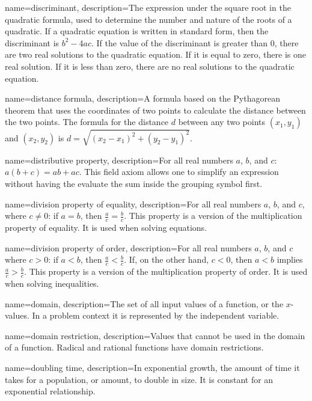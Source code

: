  {
	name=discriminant,
	description={The expression under the square root in the quadratic formula, used to determine the number and nature of the roots of a quadratic. If a quadratic equation is written in standard form, then the discriminant is $b^2 - 4ac$. If the value of the discriminant is greater than 0, there are two real solutions to the quadratic equation. If it is equal to zero, there is one real solution. If it is less than zero, there are no real solutions to the quadratic equation.}
}

 {
	name=distance formula,
	description={A formula based on the Pythagorean theorem that uses the coordinates of two points to calculate the distance between the two points. The formula for the distance $d$ between any two points $(x_1, y_1)$ and $(x_2, y_2)$ is $d = \sqrt{ (x_2 - x_1)^2 + (y_2 - y_1)^2 }$.}
}

 {
	name=distributive property,
	description={For all real numbers $a$, $b$, and $c$: $a (b + c) = ab + ac$. This field axiom allows one to simplify an expression without having the evaluate the sum inside the grouping symbol first.}
}

 {
	name=division property of equality,
	description={For all real numbers $a$, $b$, and $c$, where $c \neq 0$: if $a = b$, then $\frac{a}{c} = \frac{b}{c}$. This property is a version of the multiplication property of equality. It is used when solving equations.}
}

 {
	name=division property of order,
	description={For all real numbers $a$, $b$, and $c$ where $c>0$: if $a < b$, then $\frac{a}{c} < \frac{b}{c}$. If, on the other hand, $c<0$, then $a < b$ implies $\frac{a}{c} > \frac{b}{c}$. This property is a version of the multiplication property of order. It is used when solving inequalities.}
}

 {
	name=domain,
	description={The set of all input values of a function, or the $x$-values. In a problem context it is represented by the independent variable.}
}

 {
	name=domain restriction,
	description={Values that cannot be used in the domain of a function. Radical and rational functions have domain restrictions.}
}

 {
	name=doubling time,
	description={In exponential growth, the amount of time it takes for a population, or amount, to double in size. It is constant for an exponential relationship.}
}

